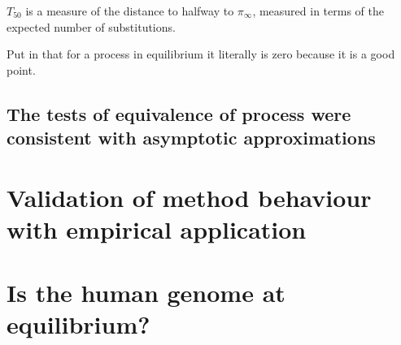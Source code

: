 ${T_{50}}$ is a measure of the distance to halfway to $\pi_\infty$, measured in terms of the expected number of substitutions. 

Put in that for a process in equilibrium it literally is zero because it is a good point.



\subsection*{The tests of equivalence of process were consistent with asymptotic approximations}



\section*{Validation of method behaviour with empirical application}



\section*{Is the human genome at equilibrium?}